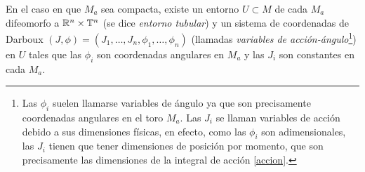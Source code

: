  \begin{thm}
   En el caso en que $M_a$ sea compacta, existe un entorno $U\subset M$ de cada $M_a$ difeomorfo a $\mathbb{R}^n \times \mathbb{T}^n$ (se dice \emph{entorno tubular}) y un sistema de coordenadas de Darboux $(J,\phi)=(J_1,\dots,J_n,\phi_1,\dots,\phi_n)$ (llamadas \emph{variables de acción-ángulo}\footnote{Las $\phi_i$ suelen llamarse variables de ángulo ya que son precisamente coordenadas angulares en el toro $M_a$. Las $J_i$ se llaman variables de acción debido a sus dimensiones físicas, en efecto, como las $\phi_i$ son adimensionales, las $J_i$ tienen que tener dimensiones de posición por momento, que son precisamente las dimensiones de la integral de acción \eqref{accion}.}) en $U$ tales que las $\phi_i$ son coordenadas angulares en $M_a$ y las $J_i$ son constantes en cada $M_a$. 
\end{thm}

